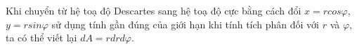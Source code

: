 \documentclass[preview]{standalone}
\begin{document}
\begin{center}
Khi chuyển từ hệ toạ độ Descartes sang hệ toạ độ cực bằng cách đổi \textbf{$x=rcos\varphi$}, \textbf{$y=rsin\varphi$} sử dụng tính gần đúng của giới hạn khi tính tích phân đối với \textbf{$r$} và \textbf{$\varphi$}, ta có thể viết lại \textbf{$dA = rdrd\varphi$}.
\end{center}
\end{document}
